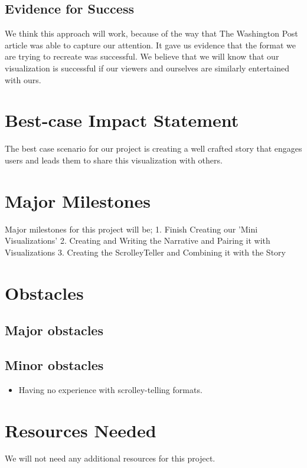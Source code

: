 \documentclass{proc}
\begin{document}
\subsection{Evidence for Success}
We think this approach will work, because of the way that The Washington Post article was able to capture our attention. It gave us evidence that the format we are trying to recreate was successful. We believe that we will know that our visualization is successful if our viewers and ourselves are similarly entertained with ours.

\section{Best-case Impact Statement}
The best case scenario for our project is creating a well crafted story that engages users and leads them to share this visualization with others.


\section{Major Milestones}
Major milestones for this project will be; 1. Finish Creating our 'Mini Visualizations' 2. Creating and Writing the Narrative and Pairing it with Visualizations 3. Creating the ScrolleyTeller and Combining it with the Story
\section{Obstacles}

\subsection{Major obstacles} %

\subsection{Minor obstacles}
\begin{itemize}
    \item Having no experience with scrolley-telling formats.
\end{itemize}
\section{Resources Needed}
We will not need any additional resources for this project.
\end{document}
